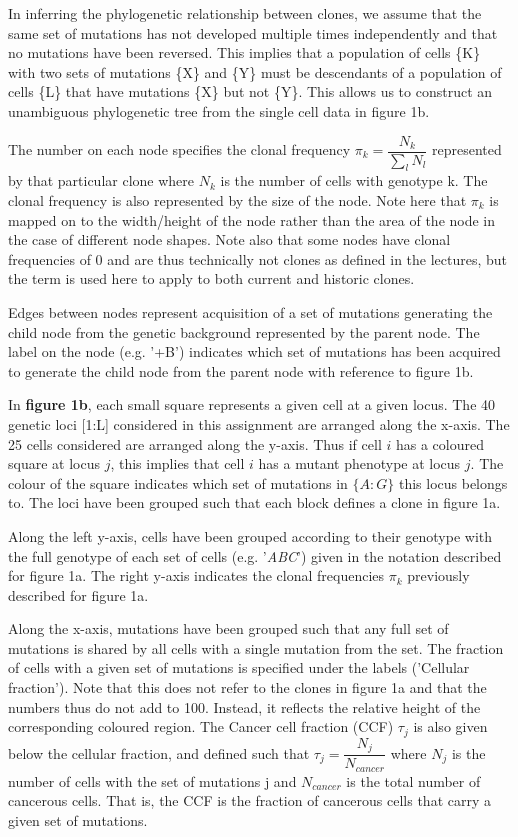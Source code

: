 \documentclass{article}
\begin{document}
In inferring the phylogenetic relationship between clones,  we assume that the same set of mutations has not developed multiple times independently and that no mutations have been reversed. This implies that a population of cells \{K\} with two sets of mutations \{X\} and \{Y\} must be descendants of a population of cells \{L\} that have mutations \{X\} but not \{Y\}. This allows us to construct an unambiguous phylogenetic tree from the single cell data in figure 1b.

The number on each node specifies the clonal frequency $\pi_k = \dfrac{N_k}{\sum_l{N_l}}$ represented by that particular clone where $N_k$ is the number of cells with genotype k. The clonal frequency is also represented by the size of the node. Note here that $\pi_k$ is mapped on to the width/height of the node rather than the area of the node in the case of different node shapes. Note also that some nodes have clonal frequencies of 0 and are thus technically not clones as defined in the lectures, but the term is used here to apply to both current and historic clones.

Edges between nodes represent acquisition of a set of mutations generating the child node from the genetic background represented by the parent node. The label on the node (e.g. '+B') indicates which set of mutations has been acquired to generate the child node from the parent node with reference to figure 1b.

In \textbf{figure 1b}, each small square represents a given cell at a given locus. The 40 genetic loci [1:L] considered in this assignment are arranged along the x-axis. The 25 cells considered are arranged along the y-axis. Thus if cell $i$ has a coloured square at locus $j$, this implies that cell $i$ has a mutant phenotype at locus $j$. The colour of the square indicates which set of mutations in $\{A:G\}$ this locus belongs to. The loci have been grouped such that each block defines a clone in figure 1a.

Along the left y-axis, cells have been grouped according to their genotype with the full genotype of each set of cells (e.g. '\textit{ABC}') given in the notation described for figure 1a. The right y-axis indicates the clonal frequencies $\pi_k$ previously described for figure 1a.

Along the x-axis, mutations have been grouped such that any full set of mutations is shared by all cells with a single mutation from the set. The fraction of cells with a given set of mutations is specified under the labels ('Cellular fraction'). Note that this does not refer to the clones in figure 1a and that the numbers thus do not add to 100. Instead, it reflects the relative height of the corresponding coloured region. The Cancer cell fraction (CCF) $\tau_j$ is also given below the cellular fraction, and defined such that $\tau_j = \dfrac{N_j}{N_{cancer}}$ where $N_j$ is the number of cells with the set of mutations j and $N_{cancer}$ is the total number of cancerous cells. That is, the CCF is the fraction of cancerous cells that carry a given set of mutations.
\end{document}
